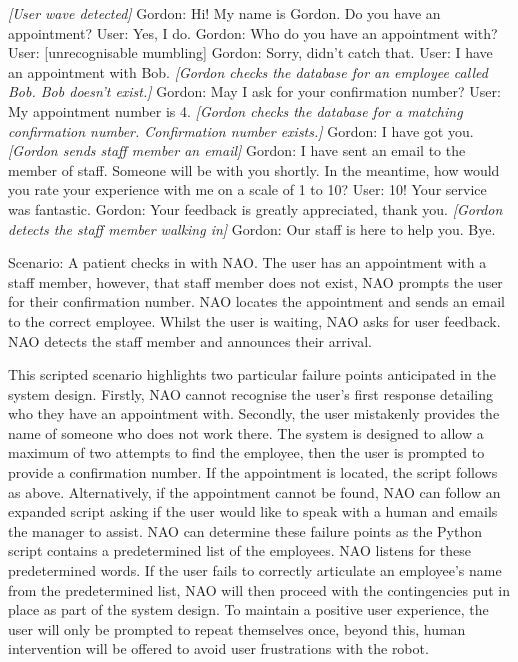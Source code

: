 \documentclass[conference]{IEEEtran}
\begin{document}
\textit{[User wave detected]}
Gordon: Hi! My name is Gordon. Do you have an appointment?
User: Yes, I do.
Gordon: Who do you have an appointment with?
User: [unrecognisable mumbling]
Gordon: Sorry, didn't catch that.
User: I have an appointment with Bob.
\textit{[Gordon checks the database for an employee called Bob. Bob doesn’t exist.]}
Gordon: May I ask for your confirmation number?
User: My appointment number is 4.
\textit{[Gordon checks the database for a matching confirmation number. Confirmation number exists.]}
Gordon: I have got you.
\textit{[Gordon sends staff member an email]}
Gordon: I have sent an email to the member of staff. Someone will be with you shortly.  In the meantime, how would you rate your experience with me on a scale of 1 to 10?
User: 10! Your service was fantastic.
Gordon: Your feedback is greatly appreciated, thank you. 
\textit{[Gordon detects the staff member walking in]}
Gordon: Our staff is here to help you. Bye.

Scenario: A patient checks in with NAO. The user has an appointment with a staff member, however, that staff member does not exist, NAO prompts the user for their confirmation number. NAO locates the appointment and sends an email to the correct employee. Whilst the user is waiting, NAO asks for user feedback. NAO detects the staff member and announces their arrival.

This scripted scenario highlights two particular failure points anticipated in the system design. Firstly, NAO cannot recognise the user’s first response detailing who they have an appointment with. Secondly, the user mistakenly provides the name of someone who does not work there.  The system is designed to allow a maximum of two attempts to find the employee, then the user is prompted to provide a confirmation number. If the appointment is located, the script follows as above. Alternatively, if the appointment cannot be found, NAO can follow an expanded script asking if the user would like to speak with a human and emails the manager to assist. NAO can determine these failure points as the Python script contains a predetermined list of the employees. NAO listens for these predetermined words. If the user fails to correctly articulate an employee’s name from the predetermined list, NAO will then proceed with the contingencies put in place as part of the system design. To maintain a positive user experience, the user will only be prompted to repeat themselves once, beyond this, human intervention will be offered to avoid user frustrations with the robot. 
\end{document}
